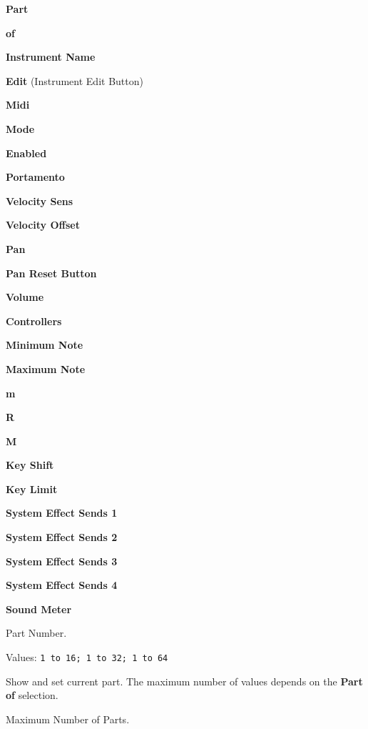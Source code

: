    \begin{enumber}
      \item \textbf{Part}
      \item \textbf{of}
      \item \textbf{Instrument Name}
      \item \textbf{Edit} (Instrument Edit Button)
      \item \textbf{Midi}
      \item \textbf{Mode}
      \item \textbf{Enabled}
      \item \textbf{Portamento}
      \item \textbf{Velocity Sens}
      \item \textbf{Velocity Offset}
      \item \textbf{Pan}
      \item \textbf{Pan Reset Button}
      \item \textbf{Volume}
      \item \textbf{Controllers}
      \item \textbf{Minimum Note}
      \item \textbf{Maximum Note}
      \item \textbf{m}
      \item \textbf{R}
      \item \textbf{M}
      \item \textbf{Key Shift}
      \item \textbf{Key Limit}
      \item \textbf{System Effect Sends 1}
      \item \textbf{System Effect Sends 2}
      \item \textbf{System Effect Sends 3}
      \item \textbf{System Effect Sends 4}
      \item \textbf{Sound Meter}
   \end{enumber}

   \setcounter{ItemCounter}{0}      %

   Part Number.

   Values: \texttt{1 to 16; 1 to 32; 1 to 64 }

   Show and set current part.  The maximum number of values depends on the
   \textbf{Part of} selection.

   Maximum Number of Parts.

